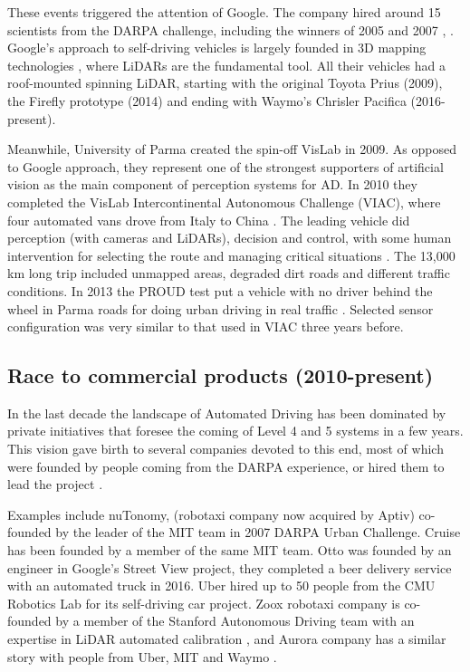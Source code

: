 These events triggered the attention of Google. 
The company hired around 15 scientists from the DARPA challenge, 
including the winners of 2005 and 2007 \cite{Montemerlo2008}, 
\cite{Levinson2011}. Google's approach to self-driving vehicles is largely 
founded in 3D mapping technologies \cite{Chapell2016}, where LiDARs are the 
fundamental tool. All their vehicles had a roof-mounted spinning LiDAR,
starting with the original Toyota Prius (2009), the Firefly prototype (2014)
and ending with Waymo's Chrisler Pacifica (2016-present).

Meanwhile, University of Parma created the spin-off VisLab in 2009. 
As opposed to Google approach, they represent one of the strongest supporters
of artificial vision as the main component of perception systems for AD. 
In 2010 they completed the VisLab Intercontinental Autonomous 
Challenge (VIAC), where four automated vans drove from Italy to China 
\cite{Bertozzi2011}.
The leading vehicle did perception (with cameras and LiDARs), decision and 
control, with some human intervention for selecting the route and managing 
critical situations \cite{Broggi2012}. The 13,000 km long trip included
unmapped areas, degraded dirt roads and different traffic conditions. 
In 2013 the PROUD test put a vehicle with no driver behind the wheel in Parma 
roads for doing urban driving in real traffic \cite{Broggi2013}. 
Selected sensor configuration was very similar to that used in VIAC three years
before.
 
\subsection{Race to commercial products (2010-present)}
 
In the last decade the landscape of Automated Driving has been dominated by 
private initiatives that foresee the coming of Level 4 and 5 systems in a few 
years. This vision gave birth to several companies devoted to this end, most of 
which were founded by people coming from the DARPA experience, or hired them to
lead the project \cite{Chapell2016}. 

Examples include nuTonomy, (robotaxi company now acquired by Aptiv) co-founded
by the leader of the MIT team in 2007 DARPA Urban Challenge. Cruise has been
founded by a member of the same MIT team.
Otto was founded by an engineer in Google's Street View project, they completed
a beer delivery service with an automated truck in 2016.
Uber hired up to 50 people from the CMU Robotics Lab for its self-driving car 
project. Zoox robotaxi company is co-founded by a member of the Stanford 
Autonomous Driving team with an expertise in LiDAR automated calibration 
\cite{Levinson2011a}, and Aurora company has a similar story with people from 
Uber, MIT and Waymo \cite{Anderson2013}.


